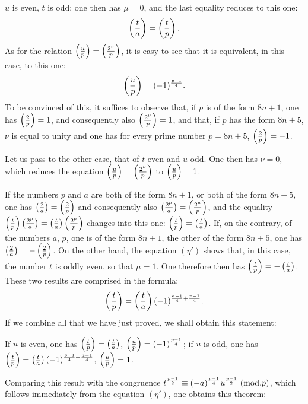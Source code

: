 \noindent
$u$ is even, $t$ is odd; one then has $\mu=0$, and the last equality reduces
to this one:
\[
\left(\frac{t}{a}\right)=\left(\frac{t}{p}\right).
\]
As for the relation $\left(\frac{u}{p}\right)=\left(\frac{2^\nu}{p}\right)$, it is easy to see that it is equivalent, in
this case, to this one:
\[
\left(\frac{u}{p}\right)=(-1)^{\frac{p-1}{4}}.
\]
To be convinced of this, it suffices to observe that, if $p$ is of the form $8n+1$,
one has $\left(\frac{2}{p}\right)=1$, and consequently also $\left(\frac{2^\nu}{p}\right)=1$, and that, if $p$ has the form
$8n+5$, $\nu$ is equal to unity and one has for every prime number $p=8n+5$,
$\left(\frac{2}{p}\right)=-1$.
\par\indent
Let us pass to the other case, that of $t$ even and $u$ odd. One then has
$\nu=0$, which reduces the equation $\left(\frac{u}{p}\right)=\left(\frac{2^\nu}{p}\right)$ to $\left(\frac{u}{p}\right)=1$.
\par\indent
If the numbers $p$ and $a$ are both of the form $8n+1$, or both
of the form $8n+5$, one has $\left(\frac{2}{a}\right)=\left(\frac{2}{p}\right)$ and consequently also
$\left(\frac{2^\mu}{a}\right)=\left(\frac{2^\mu}{p}\right)$, and the equality $\left(\frac{t}{p}\right)\left(\frac{2^\mu}{a}\right)=\left(\frac{t}{a}\right)\left(\frac{2^\mu}{p}\right)$ changes into this one:
$\left(\frac{t}{p}\right)=\left(\frac{t}{a}\right)$. If, on the contrary, of the numbers $a$, $p$, one is of the form $8n+1$,
the other of the form $8n+5$, one has $\left(\frac{2}{a}\right)=-\left(\frac{2}{p}\right)$. On the other hand, the equation
$(\eta')$ shows that, in this case, the number $t$ is oddly even, so that
$\mu=1$. One therefore then has $\left(\frac{t}{p}\right)=-\left(\frac{t}{a}\right)$. These two results are comprised
in the formula:
\[
\left(\frac{t}{p}\right)=\left(\frac{t}{a}\right)(-1)^{\frac{a-1}{4}+\frac{p-1}{4}}.
\]
If we combine all that we have just proved, we shall obtain this statement:
\par\noindent\hspace*{.06\linewidth}\begin{minipage}{.94\linewidth}
\indent If $u$ is even, one has $\left(\frac{t}{p}\right)=\left(\frac{t}{a}\right)$, $\left(\frac{u}{p}\right)=(-1)^{\frac{p-1}{4}}$; if $u$ is odd,
one has $\left(\frac{t}{p}\right)=\left(\frac{t}{a}\right)(-1)^{\frac{p-1}{4}+\frac{a-1}{4}}$, $\left(\frac{u}{p}\right)=1$.
\end{minipage}
\par\indent
Comparing this result with the congruence $t^{\frac{p-1}{2}}\equiv(-a)^{\frac{p-1}{4}}u^{\frac{p-1}{2}}\;(\mathrm{mod}.p)$,
which follows immediately from the equation $(\eta')$, one obtains this theorem:
